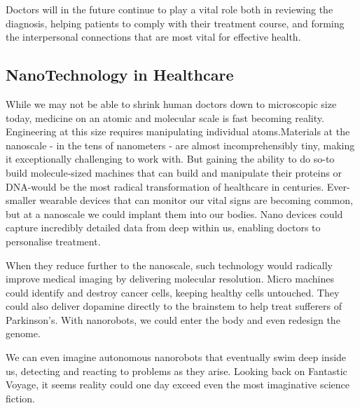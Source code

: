 \documentclass[12pt]{article}
\begin{document}
Doctors will in the future continue to play a vital role both in reviewing the diagnosis, helping patients to comply with their treatment course, and forming the interpersonal connections that are most vital for effective health.
\subsection{NanoTechnology in Healthcare}
While we may not be able to shrink human doctors down to microscopic size today, medicine on an atomic and molecular scale is fast becoming reality.\newline
Engineering at this size requires manipulating individual atoms.Materials at the nanoscale - in the tens of nanometers - are almost incomprehensibly tiny, making  it exceptionally challenging to work with. But gaining the ability to do so-to build molecule-sized machines that can build and manipulate their proteins or DNA-would be the most radical transformation of healthcare in centuries.\newline
Ever-smaller wearable devices that can monitor our vital signs are becoming common, but at a nanoscale we could implant them into our bodies. Nano devices could capture incredibly detailed data from deep within us, enabling doctors to personalise treatment.\newline

When they reduce further to the nanoscale, such technology would radically improve medical imaging by delivering molecular resolution. Micro machines could identify and destroy cancer cells, keeping healthy cells untouched. They could also deliver dopamine directly to the brainstem to help treat sufferers of Parkinson's. With nanorobots, we could enter the body and even redesign the genome.\newline

We can even imagine autonomous nanorobots that eventually swim deep inside us, detecting and reacting to problems as they arise. Looking back on Fantastic Voyage, it seems reality could one day exceed even the most imaginative science fiction.
\end{document}
